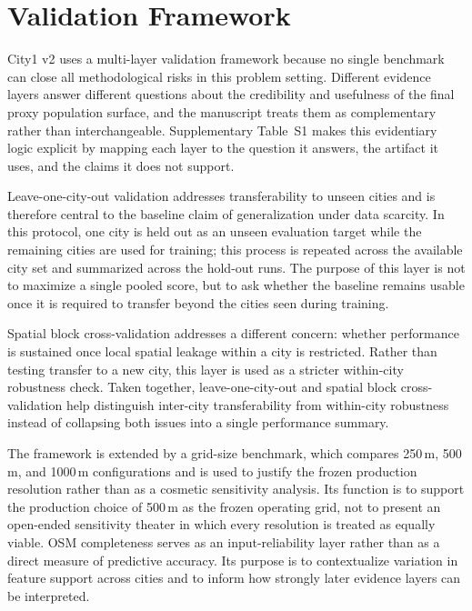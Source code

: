 \section{Validation Framework}

City1 v2 uses a multi-layer validation framework because no single benchmark can close all methodological risks in this problem setting. Different evidence layers answer different questions about the credibility and usefulness of the final proxy population surface, and the manuscript treats them as complementary rather than interchangeable. Supplementary Table~S1 makes this evidentiary logic explicit by mapping each layer to the question it answers, the artifact it uses, and the claims it does not support.

Leave-one-city-out validation addresses transferability to unseen cities and is therefore central to the baseline claim of generalization under data scarcity. In this protocol, one city is held out as an unseen evaluation target while the remaining cities are used for training; this process is repeated across the available city set and summarized across the hold-out runs. The purpose of this layer is not to maximize a single pooled score, but to ask whether the baseline remains usable once it is required to transfer beyond the cities seen during training.

Spatial block cross-validation addresses a different concern: whether performance is sustained once local spatial leakage within a city is restricted. Rather than testing transfer to a new city, this layer is used as a stricter within-city robustness check. Taken together, leave-one-city-out and spatial block cross-validation help distinguish inter-city transferability from within-city robustness instead of collapsing both issues into a single performance summary.

The framework is extended by a grid-size benchmark, which compares 250\,m, 500\,m, and 1000\,m configurations and is used to justify the frozen production resolution rather than as a cosmetic sensitivity analysis. Its function is to support the production choice of 500\,m as the frozen operating grid, not to present an open-ended sensitivity theater in which every resolution is treated as equally viable. OSM completeness serves as an input-reliability layer rather than as a direct measure of predictive accuracy. Its purpose is to contextualize variation in feature support across cities and to inform how strongly later evidence layers can be interpreted.

